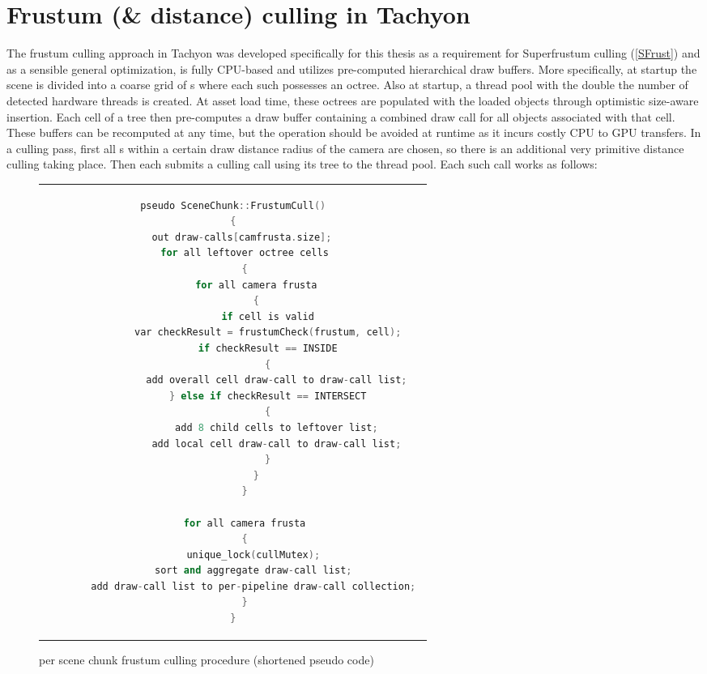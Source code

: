 \section{Frustum (\& distance) culling in \gls{Tachyon}}
The frustum culling approach in \gls{Tachyon} was developed specifically for this thesis as a requirement for Superfrustum culling (\autoref{SFrust}) and as a sensible general optimization, is fully CPU-based and utilizes pre-computed hierarchical draw buffers. More specifically, at startup the scene is divided into a coarse grid of s where each such  possesses an octree. Also at startup, a thread pool with the double the number of detected hardware threads is created. At asset load time, these octrees are populated with the loaded objects through optimistic size-aware insertion. Each cell of a tree then pre-computes a draw buffer containing a combined draw call for all objects associated with that cell. These buffers can be recomputed at any time, but the operation should be avoided at runtime as it incurs costly CPU to GPU transfers. 
In a culling pass, first all s within a certain draw distance radius of the camera are chosen, so there is an additional very primitive distance culling taking place. Then each  submits a culling call using its tree to the thread pool. Each such call works as follows: 

\begin{figure}[H]
  \centering
  \begin{tabular}{c}
  \begin{lstlisting}[language=C++]
pseudo SceneChunk::FrustumCull()
{
	out	draw-calls[camfrusta.size]; 
	for all leftover octree cells
	{
		for all camera frusta
		{
			if cell is valid
			var checkResult = frustumCheck(frustum, cell);
			if checkResult == INSIDE
			{
				add overall cell draw-call to draw-call list; 
			} else if checkResult == INTERSECT
			{
				add 8 child cells to leftover list; 
				add local cell draw-call to draw-call list; 
			}
		}
	}
	
	for all camera frusta
	{
		unique_lock(cullMutex); 
		sort and aggregate draw-call list; 
		add draw-call list to per-pipeline draw-call collection; 
	}
}
  \end{lstlisting}
  \end{tabular}
  \caption[SceneChunk's FrustumCull()]{per scene chunk frustum culling procedure (shortened pseudo code)}\label{fig:lst_SceneChunk_FrustumCull}
\end{figure}

